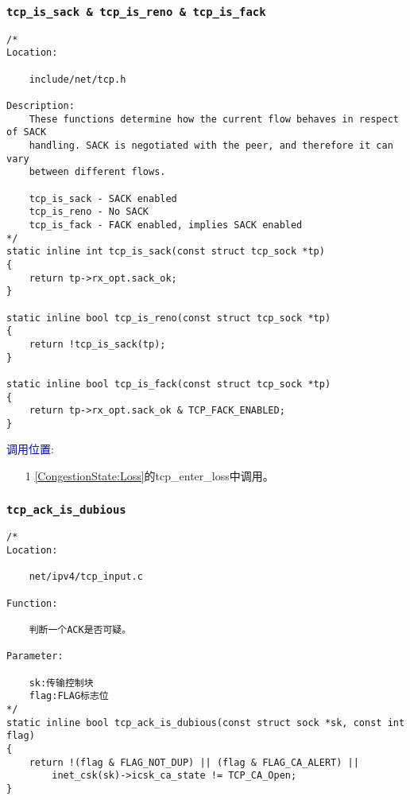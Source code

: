         \subsubsection{\texttt{tcp_is_sack & tcp_is_reno & tcp_is_fack}}
            \label{ACKCheck:IsSACK,IsReno,IsFack}
\begin{verbatim}
/* 
Location:

    include/net/tcp.h

Description:
    These functions determine how the current flow behaves in respect of SACK
    handling. SACK is negotiated with the peer, and therefore it can vary
    between different flows.

    tcp_is_sack - SACK enabled
    tcp_is_reno - No SACK
    tcp_is_fack - FACK enabled, implies SACK enabled
*/
static inline int tcp_is_sack(const struct tcp_sock *tp)
{
    return tp->rx_opt.sack_ok;
}

static inline bool tcp_is_reno(const struct tcp_sock *tp)
{
    return !tcp_is_sack(tp);
}

static inline bool tcp_is_fack(const struct tcp_sock *tp)
{
    return tp->rx_opt.sack_ok & TCP_FACK_ENABLED;
}
\end{verbatim}

        \textcolor{blue}{调用位置}:

            \begin{enumerate}
                \item[1]        \ref{CongestionState:Loss}的tcp\_enter\_loss中调用。
            \end{enumerate}

        \subsubsection{\texttt{tcp_ack_is_dubious}}
            \label{ACKCheck:tcp_ack_is_dubious}
\begin{verbatim}
/*
Location:

    net/ipv4/tcp_input.c

Function:

    判断一个ACK是否可疑。

Parameter:

    sk:传输控制块
    flag:FLAG标志位
*/
static inline bool tcp_ack_is_dubious(const struct sock *sk, const int flag)
{
    return !(flag & FLAG_NOT_DUP) || (flag & FLAG_CA_ALERT) ||
        inet_csk(sk)->icsk_ca_state != TCP_CA_Open;
}
\end{verbatim}

